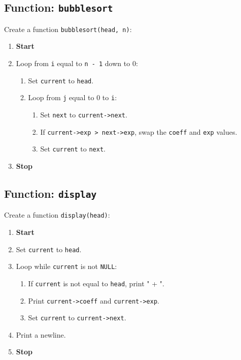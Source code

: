 {  \subsection{Function: \texttt{bubblesort}}
  Create a function \texttt{bubblesort(head, n)}:
  \begin{enumerate}[label=\arabic*:,left=0pt]
    \item \textbf{Start}
    \item Loop from \texttt{i} equal to \texttt{n - 1} down to 0:
          \begin{enumerate}[label=2.\arabic*:, start=1]
            \item Set \texttt{current} to \texttt{head}.
            \item Loop from \texttt{j} equal to 0 to \texttt{i}:
                  \begin{enumerate}[label=2.2.\arabic*:, start=1]
                    \item Set \texttt{next} to \texttt{current->next}.
                    \item If \texttt{current->exp > next->exp}, swap the \texttt{coeff} and \texttt{exp} values.
                    \item Set \texttt{current} to \texttt{next}.
                  \end{enumerate}
          \end{enumerate}
    \item \textbf{Stop}
  \end{enumerate}

  \subsection{Function: \texttt{display}}
  Create a function \texttt{display(head)}:
  \begin{enumerate}[label=\arabic*:,left=0pt]
    \item \textbf{Start}
    \item Set \texttt{current} to \texttt{head}.
    \item Loop while \texttt{current} is not \texttt{NULL}:
          \begin{enumerate}[label=2.\arabic*:, start=1]
            \item If \texttt{current} is not equal to \texttt{head}, print " + ".
            \item Print \texttt{current->coeff} and \texttt{current->exp}.
            \item Set \texttt{current} to \texttt{current->next}.
          \end{enumerate}
    \item Print a newline.
    \item \textbf{Stop}
  \end{enumerate}

}
